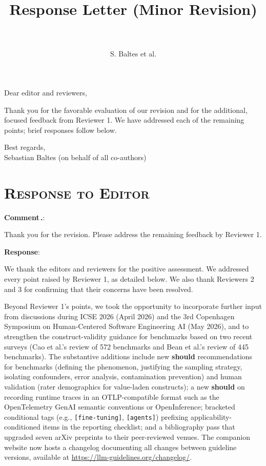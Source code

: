 \documentclass[11pt]{article}
\author{S. Baltes et al.}
\title{%
  \textbf{Response Letter (Minor Revision)}\\
  \papertitle\\
  {\large \paperid}
}
\makeatletter
\newcounter{reviewer}
\newcounter{comment}[reviewer]
\renewcommand{\thecomment}{Comment\,\thereviewer.\arabic{comment}}
\newenvironment{reviewcomment}
{%
  \refstepcounter{comment}%
  \begingroup
    \edef\@tempa{comment:\thereviewer.\arabic{comment}}%
    \label{\@tempa}%
  \endgroup
  \needspace{8\baselineskip}%
  \bigskip\noindent
  \textbf{\thecomment}:%
  \begin{commentquote}{}%
}%
{%
  \end{commentquote}%
  \medskip\par
}
\newenvironment{response}
{%
  \needspace{6\baselineskip}%
  \par\medskip\noindent\textbf{Response}:\\%
  \phantomsection%
  \begingroup
    \edef\@tempa{response:\thereviewer.\arabic{comment}}%
    \label{\@tempa}%
  \endgroup
}
{%
  \medskip\par
}
\makeatother
\begin{document}
\maketitle

\noindent Dear editor and reviewers,

\medskip
\noindent Thank you for the favorable evaluation of our revision and for the additional, focused feedback from Reviewer 1.
We have addressed each of the remaining points; brief responses follow below.

\medskip
\noindent Best regards,\\
Sebastian Baltes (on behalf of all co-authors)

\section*{\textsc{Response to Editor}}

\vspace{-0.75\baselineskip}

\begin{reviewcomment}
Thank you for the revision. Please address the remaining feedback by Reviewer 1.
\end{reviewcomment}

\begin{response}
We thank the editors and reviewers for the positive assessment.
We addressed every point raised by Reviewer 1, as detailed below.
We also thank Reviewers 2 and 3 for confirming that their concerns have been resolved.

Beyond Reviewer 1's points, we took the opportunity to incorporate further input from discussions during ICSE 2026 (April 2026) and the 3rd Copenhagen Symposium on Human-Centered Software Engineering AI (May 2026), and to strengthen the construct-validity guidance for benchmarks based on two recent surveys (Cao et al.'s review of 572 benchmarks and Bean et al.'s review of 445 benchmarks). The substantive additions include new \textbf{should} recommendations for benchmarks (defining the phenomenon, justifying the sampling strategy, isolating confounders, error analysis, contamination prevention) and human validation (rater demographics for value-laden constructs); a new \textbf{should} on recording runtime traces in an OTLP-compatible format such as the OpenTelemetry GenAI semantic conventions or OpenInference; bracketed conditional tags (e.g., \texttt{[fine-tuning]}, \texttt{[agents]}) prefixing applicability-conditioned items in the reporting checklist; and a bibliography pass that upgraded seven arXiv preprints to their peer-reviewed venues. The companion website now hosts a changelog documenting all changes between guideline versions, available at \url{https://llm-guidelines.org/changelog/}.
\end{response}
\end{document}
